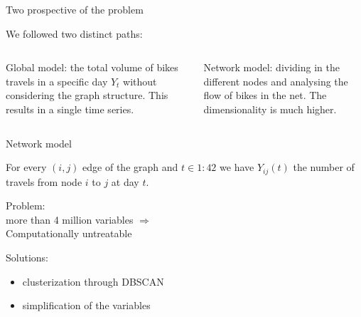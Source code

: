 \documentclass{beamer}
\begin{document}
\begin{frame}{Two prospective of the problem}

We followed two distinct paths:

\vspace{5mm}

\begin{columns}
	
	\begin{column}{.5\textwidth}
		{
			\alert{Global model:} the total volume of bikes travels in a specific day $Y_t$ without considering the graph structure. This results in a single time series.
		}
		
	\end{column}
	
	\hspace{5pt}
	
	\vrule{}
	
	\hspace{8pt}
	
	\begin{column}{.5\textwidth}
		\alert{Network model:} dividing in the different nodes and analysing the flow of bikes in the net. The dimensionality is much higher.
		
		
	\end{column}
	
\end{columns}

\end{frame}
\begin{frame}{Network model}

For every $(i,j)$ edge of the graph and $t \in 1:42$ we have $Y_{ij}(t)$ the number of travels from node $i$ to $j$ at day $t$.

\vspace{8mm}


\alert{Problem:}\\ more than 4 million variables $\Rightarrow$\\ \hspace{6mm}Computationally untreatable

\vspace{5mm}


\alert{Solutions:}

\begin{itemize}

\item clusterization through DBSCAN

\item simplification of the variables

\end{itemize}
\end{frame}
\end{document}
